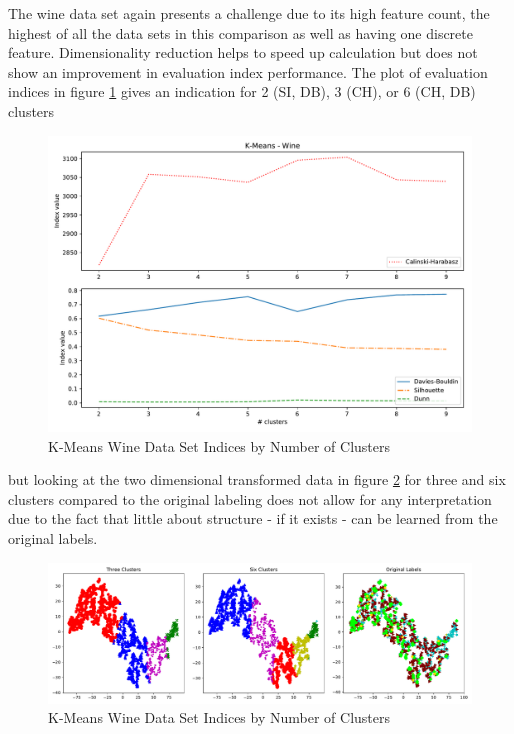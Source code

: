 The wine data set again presents a challenge due to its high feature count, the highest of all the data sets in this comparison as well as having one discrete feature. Dimensionality reduction helps to speed up calculation but does not show an improvement in evaluation index performance. The plot of evaluation indices in figure \ref{fig:kmeans_wine_indices_comparison} gives an indication for 2 (\gls{SI}, \gls{DB}), 3 (\gls{CH}), or 6 (\gls{CH}, \gls{DB}) clusters

\vspace{-0.5cm}
\begin{figure}[h]
\caption{K-Means Wine Data Set Indices by Number of Clusters}
\begin{center}
\includegraphics[width=1.0\textwidth]{images/kmeans_wine_index_plot.pdf}
\end{center}
\label{fig:kmeans_wine_indices_comparison}
\end{figure}

but looking at the two dimensional transformed data in figure \ref{fig:kmeans_wine_tsne} for three and six clusters compared to the original labeling does not allow for any interpretation due to the fact that little about structure - if it exists - can be learned from the original labels.




\begin{figure}[H]
\caption{K-Means Wine Data Set Indices by Number of Clusters}
\begin{center}
\includegraphics[width=1.0\textwidth]{images/kmeans_wine_tsne.pdf}
\end{center}
\label{fig:kmeans_wine_tsne}
\end{figure}

